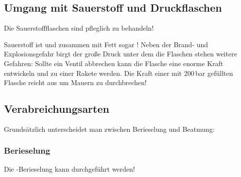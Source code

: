 \subsection{Umgang mit Sauerstoff und Druckflaschen}

Die Sauerstoffflaschen sind pfleglich zu behandeln!

Sauerstoff ist  und zusammen mit Fett
sogar ! Neben der Brand- und
Explosionsgefahr birgt der große Druck unter dem die Flaschen
stehen weitere Gefahren: Sollte ein Ventil abbrechen kann die
Flasche eine enorme Kraft entwickeln und zu einer Rakete
werden. Die Kraft einer mit 200\,bar gefüllten Flasche reicht
aus um Mauern zu durchbrechen!




\subsection{Verabreichungsarten}

Grundsätzlich unterscheidet man zwischen Berieselung und
Beatmung: 

\subsubsection{Berieselung}

Die -Berieselung kann  durchgeführt werden!



